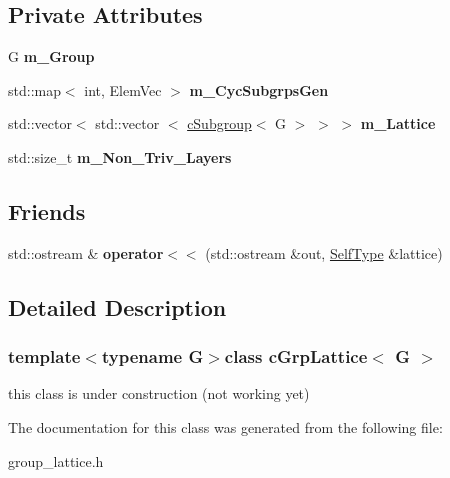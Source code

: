 \subsection*{\-Private \-Attributes}
\begin{DoxyCompactItemize}
\item 
\hypertarget{classcGrpLattice_adf219732413e288dd67173189a556bba}{\-G {\bfseries m\-\_\-\-Group}}\label{classcGrpLattice_adf219732413e288dd67173189a556bba}

\item 
\hypertarget{classcGrpLattice_a016e9d166b7cd74ef416bb4c4a22dfcc}{std\-::map$<$ int, \-Elem\-Vec $>$ {\bfseries m\-\_\-\-Cyc\-Subgrps\-Gen}}\label{classcGrpLattice_a016e9d166b7cd74ef416bb4c4a22dfcc}

\item 
\hypertarget{classcGrpLattice_a8a7ab9311e816bfa58c1f8ba727c5033}{std\-::vector$<$ std\-::vector\*
$<$ \hyperlink{classcSubgroup}{c\-Subgroup}$<$ \-G $>$ $>$ $>$ {\bfseries m\-\_\-\-Lattice}}\label{classcGrpLattice_a8a7ab9311e816bfa58c1f8ba727c5033}

\item 
\hypertarget{classcGrpLattice_a2060764d98fd699bc63323b1d5eafb63}{std\-::size\-\_\-t {\bfseries m\-\_\-\-Non\-\_\-\-Triv\-\_\-\-Layers}}\label{classcGrpLattice_a2060764d98fd699bc63323b1d5eafb63}

\end{DoxyCompactItemize}
\subsection*{\-Friends}
\begin{DoxyCompactItemize}
\item 
\hypertarget{classcGrpLattice_a96ca24361f58299e265ac93d1296733b}{std\-::ostream \& {\bfseries operator$<$$<$} (std\-::ostream \&out, \hyperlink{classcGrpLattice}{\-Self\-Type} \&lattice)}\label{classcGrpLattice_a96ca24361f58299e265ac93d1296733b}

\end{DoxyCompactItemize}


\subsection{\-Detailed \-Description}
\subsubsection*{template$<$typename G$>$class c\-Grp\-Lattice$<$ G $>$}

this class is under construction (not working yet) 

\-The documentation for this class was generated from the following file\-:\begin{DoxyCompactItemize}
\item 
group\-\_\-lattice.\-h\end{DoxyCompactItemize}
